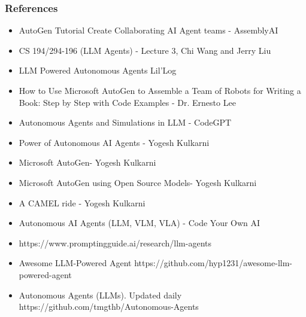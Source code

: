 \begin{frame}[fragile]\frametitle{References}
\begin{itemize}
\item AutoGen Tutorial Create Collaborating AI Agent teams - AssemblyAI
\item CS 194/294-196 (LLM Agents) - Lecture 3, Chi Wang and Jerry Liu
\item LLM Powered Autonomous Agents Lil'Log
\item How to Use Microsoft AutoGen to Assemble a Team of Robots for Writing a Book: Step by Step with Code Examples - Dr. Ernesto Lee
\item Autonomous Agents and Simulations in LLM - CodeGPT
\item Power of Autonomous AI Agents - Yogesh Kulkarni
\item Microsoft AutoGen- Yogesh Kulkarni
\item Microsoft AutoGen using Open Source Models- Yogesh Kulkarni
\item A CAMEL ride - Yogesh Kulkarni
\item Autonomous AI Agents (LLM, VLM, VLA) - Code Your Own AI
\item https://www.promptingguide.ai/research/llm-agents
\item Awesome LLM-Powered Agent https://github.com/hyp1231/awesome-llm-powered-agent
\item Autonomous Agents (LLMs). Updated daily https://github.com/tmgthb/Autonomous-Agents
\end{itemize}
\end{frame}